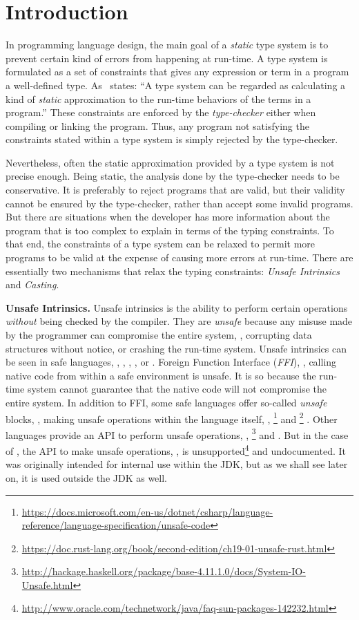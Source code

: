 
\chapter{Introduction}

In programming language design, the main goal of a \emph{static} type system is to prevent certain kind of errors from happening at run-time.
A type system is formulated as a set of constraints that gives any expression or term in a program a well-defined type.
As~\cite{pierceTypesProgrammingLanguages2002} states: ``A type system can be regarded as calculating a kind of \emph{static} approximation to the run-time behaviors of the terms in a program.''
These constraints are enforced by the \emph{type-checker} either when compiling or linking the program.
Thus, any program not satisfying the constraints stated within a type system is simply rejected by the type-checker.

Nevertheless, often the static approximation provided by a type system is not precise enough.
Being static, the analysis done by the type-checker needs to be conservative.
It is preferably to reject programs that are valid, but their validity cannot be ensured by the type-checker,
rather than accept some invalid programs.
But there are situations when the developer has more information about the program that is too complex to explain in terms of the typing constraints.
To that end, the constraints of a type system can be relaxed to permit more programs to be valid at the expense of causing more errors at run-time.
There are essentially two mechanisms that relax the typing constraints:
\emph{Unsafe Intrinsics} and \emph{Casting}.

\textbf{Unsafe Intrinsics.}
Unsafe intrinsics is the ability to perform certain operations \emph{without} being checked by the compiler.
They are \emph{unsafe} because any misuse made by the programmer can compromise the entire system, \eg{},
corrupting data structures without notice, or
crashing the run-time system.
Unsafe intrinsics can be seen in safe languages, \eg{},
,
,
, or
.
Foreign Function Interface (\emph{FFI}), \ie{}, calling native code from within a safe environment is unsafe.
It is so because the run-time system cannot guarantee that the native code will not compromise the entire system.
In addition to FFI, some safe languages offer so-called \emph{unsafe} blocks, \ie{}, making unsafe operations within the language itself, \eg{},
\footnote{\url{https://docs.microsoft.com/en-us/dotnet/csharp/language-reference/language-specification/unsafe-code}}
and
\footnote{\url{https://doc.rust-lang.org/book/second-edition/ch19-01-unsafe-rust.html}}
.
Other languages provide an API to perform unsafe operations, \eg{},
\footnote{\url{http://hackage.haskell.org/package/base-4.11.1.0/docs/System-IO-Unsafe.html}}
and
.
But in the case of , the API to make unsafe operations,
,
is unsupported\footnote{\url{http://www.oracle.com/technetwork/java/faq-sun-packages-142232.html}}
and undocumented.
It was originally intended for internal use within the JDK, but as we shall see later on, it is used outside the JDK as well.

